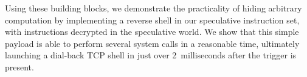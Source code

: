 Using these building blocks, we demonstrate the practicality of hiding arbitrary
computation by implementing a reverse shell in our speculative instruction set,
with instructions decrypted in the speculative world.
We show that this simple payload is able to perform several system calls in a
reasonable time, ultimately launching a dial-back TCP shell in just over
2~milliseconds after the trigger is present.










